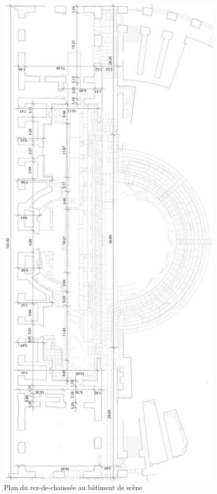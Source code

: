 \begin{figure}[!h]
	\includegraphics[height=0.8\paperheight]{images/cotes}
	\caption[Plan du rez-de-chaussée au bâtiment de scène]{Plan du rez-de-chaussée au bâtiment de scène \cite[Pl. XXI]{orangePl}}
	\label{cotes} 
\end{figure} 

